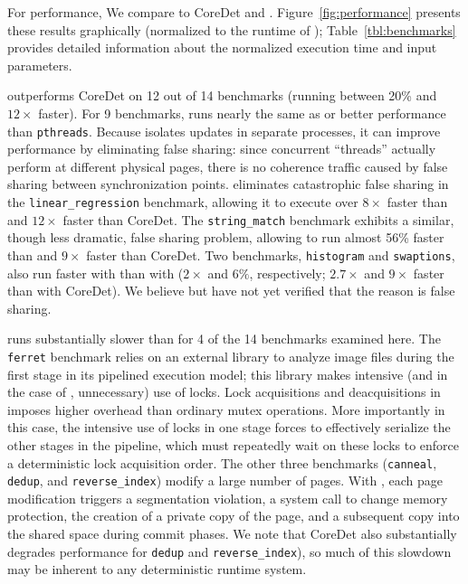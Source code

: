 For performance, We compare \dthreads{} to CoreDet
and \pthreads{}. Figure~\ref{fig:performance} presents these results graphically (normalized to the runtime of \pthreads{}); Table~\ref{tbl:benchmarks} provides detailed information about the normalized execution time and input parameters.

\dthreads{} outperforms CoreDet on 12 out of 14 benchmarks (running between 20\% and $12\times$ faster). For 9 benchmarks, \dthreads{} runs nearly the same as or better
performance than \texttt{pthreads}. Because \dthreads{} isolates updates in separate processes, it can improve performance by eliminating false sharing: since concurrent ``threads'' actually perform at different physical pages, there is no coherence traffic caused by false sharing between synchronization points. \dthreads{} eliminates catastrophic false sharing in the \texttt{linear\_regression} benchmark, allowing it to execute over $8\times$ faster than \pthreads{} and $12\times$ faster than CoreDet. The \texttt{string\_match} benchmark exhibits a similar, though less dramatic, false sharing problem, allowing \dthreads{} to run almost 56\% faster than \pthreads{} and $9\times$ faster than CoreDet. Two benchmarks, \texttt{histogram} and \texttt{swaptions}, also run faster with \dthreads{} than with \pthreads{} ($2\times$ and $6\%$, respectively; $2.7\times$ and $9\times$ faster than with CoreDet). We believe but have not yet verified that the reason is false sharing.

\dthreads{} runs substantially slower than \pthreads{} for 4 of the 14 benchmarks examined here. The \texttt{ferret} benchmark relies on an external library to analyze image files during the first stage in its pipelined execution model; this library makes intensive (and in the case of \dthreads{}, unnecessary) use of locks. Lock acquisitions and deacquisitions in \dthreads{} imposes higher overhead than ordinary \pthreads{} mutex operations. More importantly in this case, the intensive use of locks in one stage forces \dthreads{} to effectively serialize the other stages in the pipeline, which must repeatedly wait on these locks to enforce a deterministic lock acquisition order. The other three benchmarks (\texttt{canneal}, \texttt{dedup}, and \texttt{reverse\_index}) modify a large number of pages. With \dthreads{}, each page modification triggers a segmentation violation, a system call to change memory protection, the creation of a private copy of the page, and a subsequent copy into the shared space during commit phases. We note that CoreDet also substantially degrades performance for \texttt{dedup} and \texttt{reverse\_index}), so much of this slowdown may be inherent to any deterministic runtime system.

